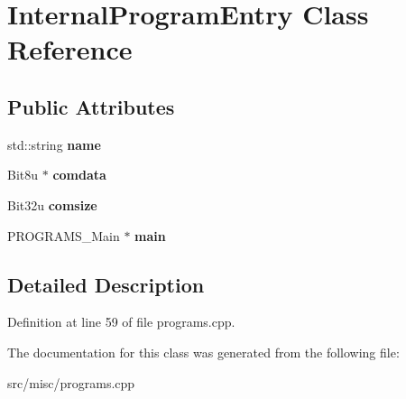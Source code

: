 \hypertarget{classInternalProgramEntry}{\section{Internal\-Program\-Entry Class Reference}
\label{classInternalProgramEntry}
}
\subsection*{Public Attributes}
\begin{DoxyCompactItemize}
\item 
\hypertarget{classInternalProgramEntry_ab03a0bab76bdea1d059d506329c3a263}{std\-::string {\bfseries name}}\label{classInternalProgramEntry_ab03a0bab76bdea1d059d506329c3a263}

\item 
\hypertarget{classInternalProgramEntry_abbd78db3ca9c4c8b882fc1a81d7227d1}{Bit8u $\ast$ {\bfseries comdata}}\label{classInternalProgramEntry_abbd78db3ca9c4c8b882fc1a81d7227d1}

\item 
\hypertarget{classInternalProgramEntry_ab361154b83327f64e5abc0d0ac1bfac5}{Bit32u {\bfseries comsize}}\label{classInternalProgramEntry_ab361154b83327f64e5abc0d0ac1bfac5}

\item 
\hypertarget{classInternalProgramEntry_ae8ad5361e417892dbd0b2284937f448a}{P\-R\-O\-G\-R\-A\-M\-S\-\_\-\-Main $\ast$ {\bfseries main}}\label{classInternalProgramEntry_ae8ad5361e417892dbd0b2284937f448a}

\end{DoxyCompactItemize}


\subsection{Detailed Description}


Definition at line 59 of file programs.\-cpp.



The documentation for this class was generated from the following file\-:\begin{DoxyCompactItemize}
\item 
src/misc/programs.\-cpp\end{DoxyCompactItemize}
